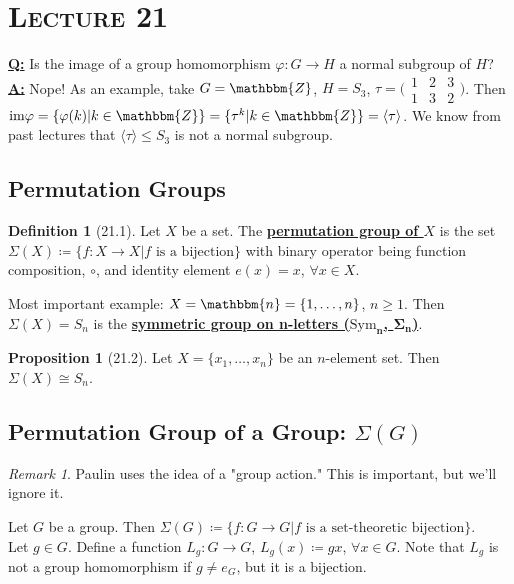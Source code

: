 \documentclass{article}
\newcommand{\Z}{\mathbbm{Z}}
\newcommand{\coleq}{\coloneqq}
\newcommand{\define}[1]{\textbf{\underline{#1}}}
\newcommand{\func}[3]{#1: #2 \to #3}
\theoremstyle{definition}
\newtheorem*{defn}{Definition}
\newtheorem*{prop}{Proposition}
\theoremstyle{remark}
\newtheorem*{rmk}{Remark}
\newcommand{\cyc}[1]{\langle#1\rangle}
\newcommand{\im}{\mathrm{im}}
\newcommand{\iso}{\cong}
\begin{document}
    \section*{\textbf{\textsc{Lecture 21}}}{
        \define{Q:} Is the image of a group homomorphism $\func{\varphi}{G}{H}$ a normal subgroup of $H$?\\
        \define{A:} Nope! As an example, take $G=\Z$, $H=S_3$, $\tau=\big(\begin{smallmatrix} 1&2&3\\ 1&3&2 \end{smallmatrix}\big)$. Then $\im\varphi=\{\varphi(k)|k\in \Z\}=\{\tau^k|k\in \Z\}=\cyc{\tau}$. We know from past lectures that $\cyc{\tau}\leq S_3$ is not a normal subgroup.
        
        \subsection*{Permutation Groups}{
            \begin{defn}[21.1]
                Let $X$ be a set. The \define{permutation group of $X$} is the set $\Sigma(X)\coleq\{\func{f}{X}{X}|f\text{ is a bijection}\}$ with binary operator being function composition, $\circ$, and identity element $e(x)=x$, $\forall x\in X$.
            \end{defn}
            
            \noindent Most important example: $X=\mathbbm{n}=\{1,\ldots,n\}$, $n\geq 1$. Then $\Sigma(X)=S_n$ is the \define{symmetric group on n-letters ($\mathbf{\mathrm{Sym}_n}$, $\mathbf{\Sigma_n}$)}.
        
            \begin{prop}[21.2]
                Let $X=\{x_1,\ldots,x_n\}$ be an $n$-element set. Then $\Sigma(X)\iso S_n$.
            \end{prop}
        }
        \subsection*{Permutation Group of a Group: $\Sigma(G)$}{
            \begin{rmk}
                Paulin uses the idea of a "group action." This is important, but we'll ignore it.
            \end{rmk}
            
        \noindent Let $G$ be a group. Then $\Sigma(G)\coleq\{\func{f}{G}{G}|f\text{ is a set-theoretic bijection}\}$.\\
        Let $g \in G$. Define a function $\func{L_g}{G}{G}$, $L_g(x)\coleq gx$, $\forall x\in G$. Note that $L_g$ is not a group homomorphism if $g\neq e_G$, but it is a bijection.
        
}}
\end{document}
